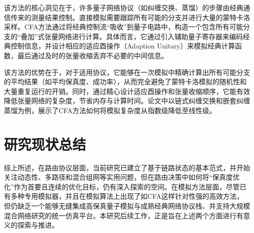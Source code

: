 该方法的核心洞见在于，许多量子网络协议（如纠缠交换、蒸馏）的步骤由经典通信传来的测量结果控制。直接模拟需要跟踪所有可能的分支并进行大量的蒙特卡洛采样。CFA方法通过将经典控制流“吸收”到量子电路中，构造一个包含所有可能分支的“叠加”式张量网络进行计算。具体而言，它通过引入辅助量子寄存器来编码经典控制信息，并设计相应的适应酉操作（Adaption Unitary）来模拟经典计算函数，最后通过及时的张量收缩丢弃不必要的中间信息。

该方法的优势在于，对于适用协议，它能够在一次模拟中精确计算出所有可能分支的平均结果（如平均保真度、成功率），从而完全避免了蒙特卡洛模拟的随机性和大量重复运行的开销。同时，通过精心设计适应酉操作和张量收缩顺序，它能有效降低张量网络的复杂度，节省内存与计算时间。论文中以链式纠缠交换和嵌套纠缠蒸馏为例，展示了CFA方法如何将模拟复杂度从指数级降低至线性级。

\section{研究现状总结}
综上所述，在路由协议层面，当前研究已建立了基于链路状态的基本范式，并开始关注动态性、多路径和混合组网等实用问题，但在路由决策中如何将“保真度优化”作为首要且连续的优化目标，仍有深入探索的空间。在模拟方法层面，尽管已有多种专用模拟器，并且在模拟算法上出现了如CFA这样针对性强的高效方法，但仍缺乏一个能够无缝集成高保真量子模拟与成熟经典网络协议栈、并支持大规模混合网络研究的统一仿真平台。本研究后续工作，正是旨在上述两个方面进行有意义的探索与推进。